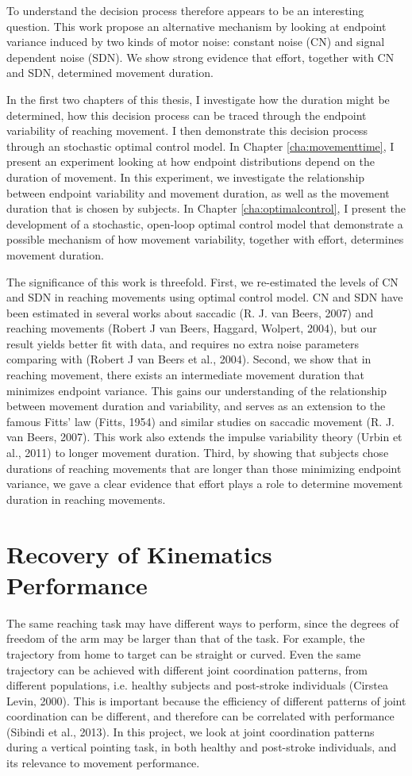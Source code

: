 To understand the decision process therefore appears to be an interesting question. 
This work propose an alternative mechanism by looking at endpoint variance induced by two kinds of motor noise: constant noise (CN) and signal dependent noise (SDN).
We show strong evidence that effort, together with CN and SDN, determined movement duration.

In the first two chapters of this thesis, I investigate how the duration might be determined, how this decision process can be traced through the endpoint variability of reaching movement. I then demonstrate this decision process through an stochastic optimal control model. 
In Chapter \ref{cha:movementtime}, I present an experiment looking at how endpoint distributions depend on the duration of movement. 
In this experiment, we investigate the relationship between endpoint variability and movement duration, as well as the movement duration that is chosen by subjects.
In Chapter \ref{cha:optimalcontrol}, I present the development of a stochastic, open-loop optimal control model that demonstrate a possible mechanism of how movement variability, together with effort, determines movement duration.

The significance of this work is threefold. First, we re-estimated the levels of CN and SDN in reaching movements using optimal control model. 
CN and SDN have been estimated in several works about saccadic (R. J. van Beers, 2007) and reaching movements (Robert J van Beers, Haggard, Wolpert, 2004), but our result yields better fit with data, and requires no extra noise parameters comparing with (Robert J van Beers et al., 2004). 
Second, we show that in reaching movement, there exists an intermediate movement duration that minimizes endpoint variance. 
This gains our understanding of the relationship between movement duration and variability, and serves as an extension to the famous Fitts’ law (Fitts, 1954) and similar studies on saccadic movement (R. J. van Beers, 2007). 
This work also extends the impulse variability theory (Urbin et al., 2011) to longer movement duration. 
Third, by showing that subjects chose durations of reaching movements that are longer than those minimizing endpoint variance, we gave a clear evidence that effort plays a role to determine movement duration in reaching movements.


\section{Recovery of Kinematics Performance}
The same reaching task may have different ways to perform, since the degrees of freedom of the arm may be larger than that of the task. 
For example, the trajectory from home to target can be straight or curved. 
Even the same trajectory can be achieved with different joint coordination patterns, from different populations, i.e. healthy subjects and post-stroke individuals (Cirstea  Levin, 2000). 
This is important because the efficiency of different patterns of joint coordination can be different, and therefore can be correlated with performance (Sibindi et al., 2013). 
In this project, we look at joint coordination patterns during a vertical pointing task, in both healthy and post-stroke individuals, and its relevance to movement performance.

